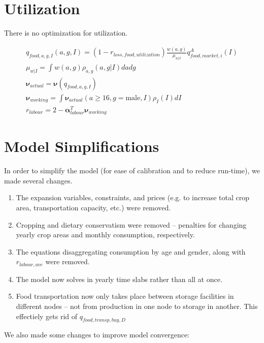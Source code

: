 \documentclass[letter,12pt]{article}
\begin{document}
\section{Utilization}

There is no optimization for utilization.

\begin{gather}
q_{food,a,g,I} \left(a,g,I\right) = \left(1-r_{loss,food,utilization}\right) \frac{w\left(a,g\right)}{\mu_{w|I}} q_{food,market,i}^A \left(I\right) \\
\mu_{w|I} = \int w\left(a,g\right) \rho_{a,g} \left(a,g|I\right) da dg \\
\boldsymbol \nu_{actual} = \boldsymbol \nu \left( q_{food,a,g,I} \right) \\
\boldsymbol \nu_{working} = \int \boldsymbol \nu_{actual} \left(a \geq 16, g = \text{male},I\right) \rho_I \left(I\right) dI \\
r_{labour} = 2 - \boldsymbol \alpha_{labour}^T \boldsymbol \nu_{working}
\end{gather}


\section{Model Simplifications}

In order to simplify the model (for ease of calibration and to reduce run-time), we made several changes.

\begin{enumerate}
\item The expansion variables, constraints, and prices (e.g. to increase total crop area, transportation capacity, etc.) were removed.
\item Cropping and dietary conservatism were removed -- penalties for changing yearly crop areas and monthly consumption, respectively.
\item The equations disaggregating consumption by age and gender, along with $r_{labour,ave}$ were removed.
\item The model now solves in yearly time slabs rather than all at once.
\item Food transportation now only takes place between storage facilities in different nodes -- not from production in one node to storage in another.  This effectiely gets rid of $q_{food,transp,buy,D}$
\end{enumerate}

We also made some changes to improve model convergence:
\end{document}
